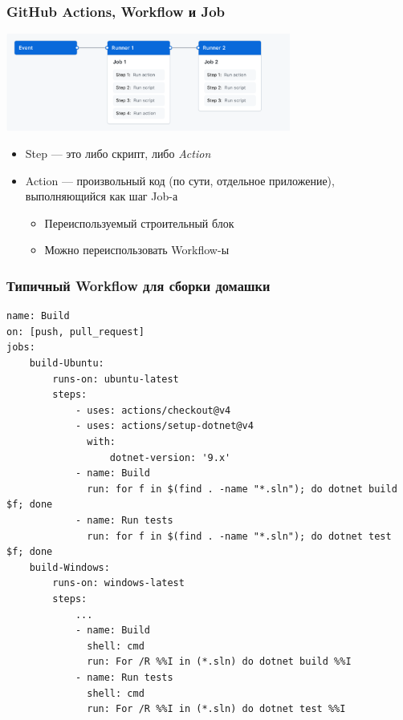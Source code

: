 \documentclass{../../slides-style}
\begin{document}
    \begin{frame}
        \frametitle{GitHub Actions, Workflow и Job}
        \begin{center}
            \includegraphics[width=0.7\textwidth]{githubActionsWorkflow}
        \end{center}
        \begin{itemize}
            \item Step --- это либо скрипт, либо \emph{Action}
            \item Action --- произвольный код (по сути, отдельное приложение), выполняющийся как шаг Job-а
            \begin{itemize}
                \item Переиспользуемый строительный блок
                \item Можно переиспользовать Workflow-ы
            \end{itemize}
        \end{itemize}
    \end{frame}

    \begin{frame}[fragile]
        \frametitle{Типичный Workflow для сборки домашки}
        \begin{scriptsize}
            \begin{verbatim}
name: Build
on: [push, pull_request]
jobs:
    build-Ubuntu:
        runs-on: ubuntu-latest
        steps:
            - uses: actions/checkout@v4
            - uses: actions/setup-dotnet@v4
              with:
                  dotnet-version: '9.x'
            - name: Build
              run: for f in $(find . -name "*.sln"); do dotnet build $f; done
            - name: Run tests
              run: for f in $(find . -name "*.sln"); do dotnet test $f; done
    build-Windows:
        runs-on: windows-latest
        steps:
            ...
            - name: Build
              shell: cmd
              run: For /R %%I in (*.sln) do dotnet build %%I
            - name: Run tests
              shell: cmd
              run: For /R %%I in (*.sln) do dotnet test %%I
            \end{verbatim}
        \end{scriptsize}
    \end{frame}
\end{document}
